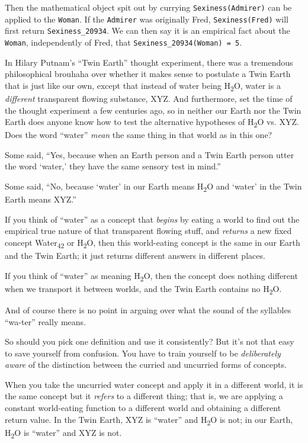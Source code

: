 Then the mathematical object spit out by currying
\texttt{Sexiness(Admirer)} can be applied to the \texttt{Woman}. If the \texttt{Admirer} was
originally Fred, \texttt{Sexiness(Fred)} will first return \texttt{Sexiness\_20934}. We
can then say it is an empirical fact about the \texttt{Woman}, independently of
Fred, that \texttt{Sexiness\_20934(Woman) = 5}.


 In Hilary Putnam's ``Twin
Earth'' thought experiment, there was a tremendous
philosophical brouhaha over whether it makes sense to postulate a Twin
Earth that is just like our own, except that instead of water being
H\textsubscript{2}O, water is a \textit{different} transparent flowing
substance, XYZ. And furthermore, set the time of the thought experiment
a few centuries ago, so in neither our Earth nor the Twin Earth does
anyone know how to test the alternative hypotheses of
H\textsubscript{2}O vs. XYZ. Does the word
``water'' \textit{mean} the same
thing in that world as in this one?


 Some said, ``Yes, because when an Earth person
and a Twin Earth person utter the word
`water,' they have the same sensory test
in mind.''


 Some said, ``No, because
`water' in our Earth means
H\textsubscript{2}O and `water' in the
Twin Earth means XYZ.''


 If you think of ``water'' as a
concept that \textit{begins} by eating a world to find out the
empirical true nature of that transparent flowing stuff, and
\textit{returns} a new fixed concept Water\textsubscript{42} or
H\textsubscript{2}O, then this world-eating concept is the same in our
Earth and the Twin Earth; it just returns different answers in
different places.


 If you think of ``water'' as
meaning H\textsubscript{2}O, then the concept does nothing different
when we transport it between worlds, and the Twin Earth contains no
H\textsubscript{2}O.


 And of course there is no point in arguing over what the sound of
the syllables ``wa-ter'' really
means.


 So should you pick one definition and use it consistently? But
it's not that easy to save yourself from confusion. You
have to train yourself to be \textit{deliberately aware} of the
distinction between the curried and uncurried forms of concepts.


 When you take the uncurried water concept and apply it in a
different world, it is the same concept but it \textit{refers} to a
different thing; that is, we are applying a constant world-eating
function to a different world and obtaining a different return value.
In the Twin Earth, XYZ is ``water''
and H\textsubscript{2}O is not; in our Earth, H\textsubscript{2}O is
``water'' and XYZ is not.


